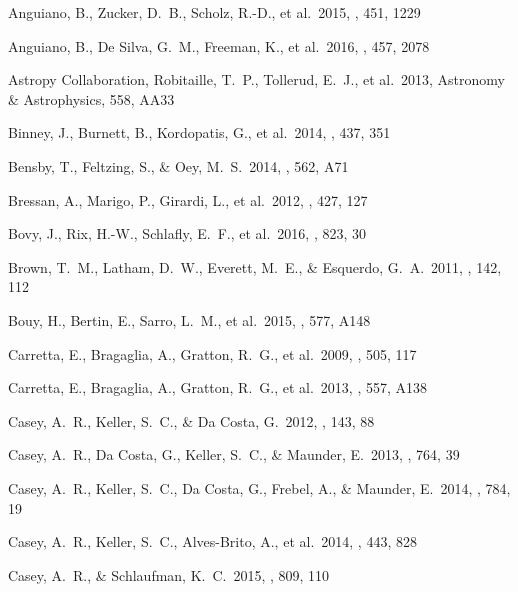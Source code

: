 \documentclass[preprint,trackchanges]{aastex}
\begin{document}
\begin{thebibliography}{dummy}
 Anguiano, B., Zucker, D.~B., Scholz, R.-D., et al.\ 2015, \mnras, 451, 1229 

 Anguiano, B., De Silva, G.~M., Freeman, K., et al.\ 2016, \mnras, 457, 2078 

 Astropy Collaboration, Robitaille, T.~P., Tollerud, E.~J., et al.\ 2013, Astronomy \& Astrophysics, 558, AA33

 Binney, J., Burnett, B., Kordopatis, G., et al.\ 2014, \mnras, 437, 351 

 Bensby, T., Feltzing, S., \& Oey, M.~S.\ 2014, \aap, 562, A71

 Bressan, A., Marigo, P., Girardi, L., et al.\ 2012, \mnras, 427, 127 
 

 Bovy, J., Rix, H.-W., Schlafly, E.~F., et al.\ 2016, \apj, 823, 30 

 Brown, T.~M., Latham, D.~W., Everett, M.~E., \& Esquerdo, G.~A.\ 2011, \aj, 142, 112 

 Bouy, H., Bertin, E., Sarro, L.~M., et al.\ 2015, \aap, 577, A148 

 Carretta, E., Bragaglia, A., Gratton, R.~G., et al.\ 2009, \aap, 505, 117 

 Carretta, E., Bragaglia, A., Gratton, R.~G., et al.\ 2013, \aap, 557, A138 

 Casey, A.~R., Keller, S.~C., \& Da Costa, G.\ 2012, \aj, 143, 88 

 Casey, A.~R., Da Costa, G., Keller, S.~C., \& Maunder, E.\ 2013, \apj, 764, 39 

 Casey, A.~R., Keller, S.~C., Da Costa, G., Frebel, A., \& Maunder, E.\ 2014, \apj, 784, 19 

 Casey, A.~R., Keller, S.~C., Alves-Brito, A., et al.\ 2014, \mnras, 443, 828 

 Casey, A.~R., \& Schlaufman, K.~C.\ 2015, \apj, 809, 110 


\end{thebibliography}
\end{document}
